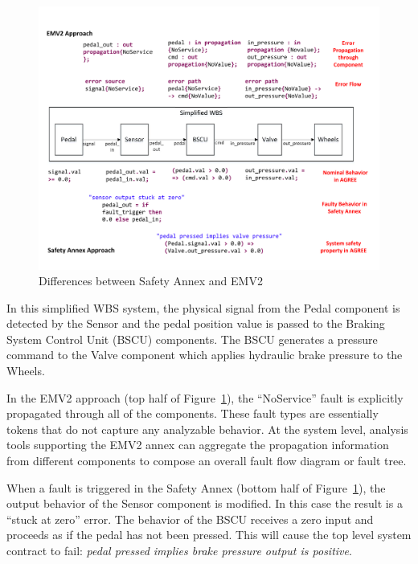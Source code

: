 \begin{figure}[h]
	\centering
	\includegraphics[trim=0 9 0 5,clip,width=\textwidth]{images/Comparison_with_EMV2.pdf}
	\caption{Differences between Safety Annex and EMV2}
	\label{fig:comparison_with_EMV2}
\end{figure} 

In this simplified WBS system, the physical signal from the Pedal component is detected by the Sensor and the pedal position value is passed to the Braking System Control Unit (BSCU) components.  The BSCU generates a pressure command to the Valve component which applies hydraulic brake pressure to the Wheels. 

In the EMV2 approach (top half of Figure~\ref{fig:comparison_with_EMV2}), the ``NoService'' fault is explicitly propagated through all of the components. These fault types are essentially tokens that do not capture any analyzable behavior. At the system level, analysis tools supporting the EMV2 annex can aggregate the propagation information from different components to compose an overall fault flow diagram or fault tree. 

When a fault is triggered in the Safety Annex (bottom half of Figure~\ref{fig:comparison_with_EMV2}), the output behavior of the Sensor component is modified. In this case the result is a ``stuck at zero'' error. The behavior of the BSCU receives a zero input and proceeds as if the pedal has not been pressed. This will cause the top level system contract to fail: {\em pedal pressed implies brake pressure output is positive}.


